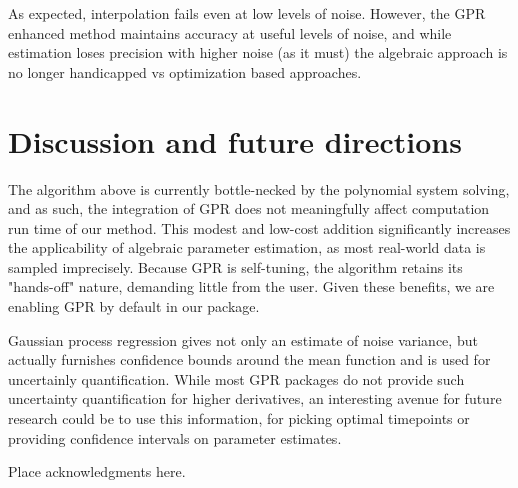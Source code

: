 \documentclass{ifacconf}
\begin{document}
	As expected, interpolation fails even at low levels of noise.  However, the GPR enhanced method maintains accuracy at useful levels of noise, and while estimation loses precision with higher noise (as it must) the algebraic approach is no longer handicapped vs optimization based approaches.
	
	\section{Discussion and future directions}
	The algorithm above is currently bottle-necked by the polynomial system solving, and as such, the integration of GPR does not meaningfully affect computation run time of our method.  This modest and low-cost addition significantly increases the applicability of algebraic parameter estimation, as most real-world data is sampled imprecisely.  Because GPR is self-tuning, the algorithm retains its "hands-off" nature, demanding little from the user.  Given these benefits, we are enabling GPR by default in our package.
	
	Gaussian process regression gives not only an estimate of noise variance, but actually furnishes confidence bounds around the mean function and is used for uncertainly quantification.  While most GPR packages do not provide such uncertainty quantification for higher derivatives, an interesting avenue for future research could be to use this information, for picking optimal timepoints or providing confidence intervals on parameter estimates.
	
	
	
	
	
	
	\begin{ack}
		Place acknowledgments here.
	\end{ack}
	
	
	
	
	
\end{document}
